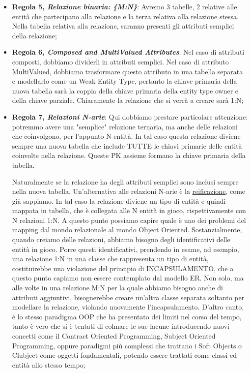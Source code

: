 \begin{itemize}
\item{\textbf{Regola 5, \textit{Relazione binaria: \{M:N\}}}}: Avremo 3 tabelle, 2 relative alle entità che partecipano alla relazione e la terza relativa alla relazione stessa. Nella tabella relativa alla relazione, saranno presenti gli attributi semplici della relazione;  

\item{\textbf{Regola 6, \textit{Composed and MultiValued Attributes}}}: Nel caso di attributi composti, dobbiamo dividerli in attributi semplici. Nel caso di attributo MultiValued, dobbiamo trasformare questo attributo in una tabella separata e modellarlo come un Weak Entity Type, pertanto la chiave primaria della nuova tabella sarà la coppia della chiave primaria della entity type owner e della chiave parziale. Chiaramente la relazione che si verrà a creare sarà 1:N; 

\item{\textbf{Regola 7, \textit{Relazioni N-arie}}}: Qui dobbiamo prestare particolare attenzione: potremmo avere una "semplice" relazione ternaria, ma anche delle relazioni che coinvolgono, per l'appunto N entità. In tal caso questa relazione diviene sempre una nuova tabella che include TUTTE le chiavi primarie delle entità coinvolte nella relazione. Queste PK assieme formano la chiave primaria della tabella. 
 
Naturalmente se la relazione ha degli attributi semplici sono inclusi sempre nella nuova tabella. Un'alternativa alle relazioni N-arie è la \underline{reificazione}, come già sappiamo. In tal caso la relazione diviene un tipo di entità e quindi mappata in tabella, che è collegata alle N entità in gioco, rispettivamente con N relazioni 1:N.   
A questo punto possiamo capire quale è uno dei problemi del mapping dal mondo relazionale al mondo Object Oriented. Sostanzialmente, quando creiamo delle relazioni, abbiamo bisogno degli identificativi delle entità in gioco. Porre questi identificativi, prendendo in esame, ad esempio, una relazione 1:N in una classe che rappresenta un tipo di entità, costituirebbe una violazione del principio di INCAPSULAMENTO, che a questo punto capiamo non essere contemplato dal modello ER. Non solo, ma alle volte in una relazione M:N per la quale abbiamo bisogno anche di attributi aggiuntivi, bisognerebbe creare un'altra classe separata soltanto per modellare la relazione, violando nuovamente l'incapsulamento. D'altro canto, è lo stesso paradigma OOP che ha presentato dei limiti nel corso del tempo, tanto è vero che si è tentati di colmare le sue lacune introducendo nuovi concetti come il Contract Oriented Programming, Subject Oriented Programming, oppure paradigmi più complessi che trattano i Soft Objects o Clubject come oggetti fondamentali, potendo essere trattati come classi ed entità allo stesso tempo; 


\end{itemize}
